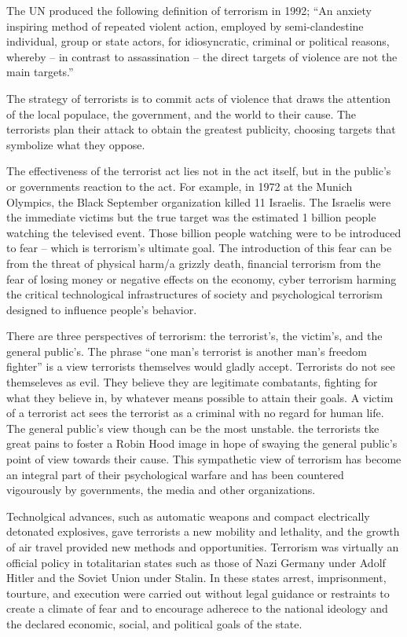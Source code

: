 \documentclass[
  openany]{book}
\begin{document}
The UN produced the following definition of terrorism in 1992; ``An anxiety inspiring method of repeated violent action, employed by semi-clandestine individual, group or state actors, for idiosyncratic, criminal or political reasons, whereby -- in contrast to assassination -- the direct targets of violence are not the main targets.''

The strategy of terrorists is to commit acts of violence that draws the attention of the local populace, the government, and the world to their cause. The terrorists plan their attack to obtain the greatest publicity, choosing targets that symbolize what they oppose.

The effectiveness of the terrorist act lies not in the act itself, but in the public's or governments reaction to the act. For example, in 1972 at the Munich Olympics, the Black September organization killed 11 Israelis. The Israelis were the immediate victims but the true target was the estimated 1 billion people watching the televised event. Those billion people watching were to be introduced to fear -- which is terrorism's ultimate goal. The introduction of this fear can be from the threat of physical harm/a grizzly death, financial terrorism from the fear of losing money or negative effects on the economy, cyber terrorism harming the critical technological infrastructures of society and psychological terrorism designed to influence people's behavior.

There are three perspectives of terrorism: the terrorist's, the victim's, and the general public's. The phrase ``one man's terrorist is another man's freedom fighter'' is a view terrorists themselves would gladly accept. Terrorists do not see themseleves as evil. They believe they are legitimate combatants, fighting for what they believe in, by whatever means possible to attain their goals. A victim of a terrorist act sees the terrorist as a criminal with no regard for human life. The general public's view though can be the most unstable. the terrorists tke great pains to foster a Robin Hood image in hope of swaying the general public's point of view towards their cause. This sympathetic view of terrorism has become an integral part of their psychological warfare and has been countered vigourously by governments, the media and other organizations.

Technolgical advances, such as automatic weapons and compact electrically detonated explosives, gave terrorists a new mobility and lethality, and the growth of air travel provided new methods and opportunities. Terrorism was virtually an official policy in totalitarian states such as those of Nazi Germany under Adolf Hitler and the Soviet Union under Stalin. In these states arrest, imprisonment, tourture, and execution were carried out without legal guidance or restraints to create a climate of fear and to encourage adherece to the national ideology and the declared economic, social, and political goals of the state.
\end{document}
